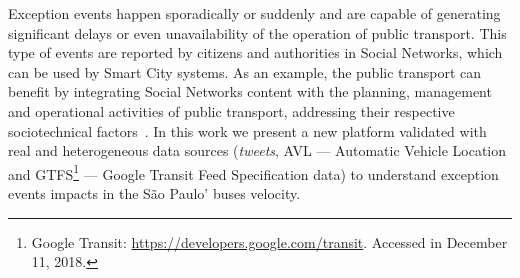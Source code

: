 \documentclass[runningheads]{llncs}
\begin{document}
Exception events happen sporadically or suddenly and are capable of generating significant delays or even unavailability of the operation of public transport. This type of events are reported by citizens and authorities in Social Networks, which can be used by Smart City systems. As an example, the public transport can benefit by integrating Social Networks content with the planning, management and operational activities of public transport, addressing their respective sociotechnical factors~\cite{kuflik2017automating}. In this work we present a new platform validated with real and heterogeneous data sources (\textit{tweets}, AVL --- Automatic Vehicle Location and GTFS\footnote{\label{googleTransit}Google Transit: \url{https://developers.google.com/transit}. Accessed in December 11, 2018.} --- Google Transit Feed Specification data) to understand exception events impacts in the São Paulo' buses velocity.

\end{document}
